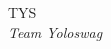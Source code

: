 \documentclass[12pt]{article}
\begin{document}
\begin{centering}


\Huge{TYS}\\
\textit{\huge{Team Yoloswag}}

\end{centering}
\end{document}
